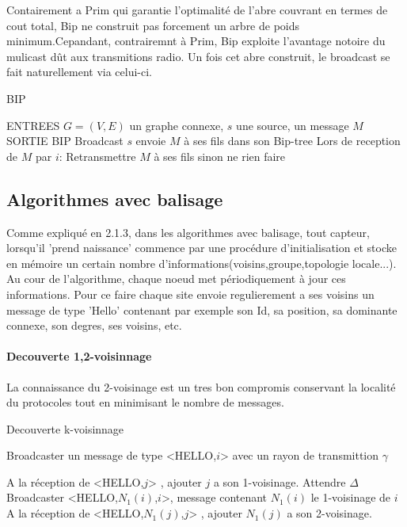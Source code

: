 Contairement a Prim qui garantie l'optimalité de l'abre couvrant en termes de cout total,
Bip ne construit pas forcement un arbre de poids minimum.Cepandant, contrairemnt à Prim, Bip exploite l'avantage notoire du mulicast dût aux transmitions radio. Un fois cet abre construit, le broadcast se fait naturellement via celui-ci.

\begin{algorithm}[h]
\caption{BIP}
\label{algo_BIP}
\begin{algorithmic}
\STATE ENTREES  $G=(V,E)$ un graphe connexe, $s$ une source, un message $M$
\STATE SORTIE  BIP Broadcast
\STATE $s$ envoie $M$ à ses fils dans son Bip-tree
\STATE Lors de reception de $M$ par $i$:
    \STATE Retransmettre $M$ à ses fils sinon ne rien faire
\ENDIF
\end{algorithmic}
\end{algorithm}


\subsection{Algorithmes avec balisage}
Comme expliqué en 2.1.3, dans les algorithmes avec balisage, tout capteur, lorsqu'il 'prend naissance' commence par une procédure d'initialisation et stocke en 
mémoire un certain nombre d'informations(voisins,groupe,topologie locale...). Au cour de l'algorithme, chaque noeud met périodiquement à jour ces informations. Pour ce faire chaque site envoie regulierement a ses voisins un message de type
'Hello' contenant par exemple son Id, sa position, sa dominante connexe, son degres, ses voisins, etc.\\
\paragraph{Decouverte 1,2-voisinnage}

La connaissance du 2-voisinage est un tres bon compromis conservant la localité du protocoles tout en minimisant le nombre de messages.


\begin{algorithm}[h]
\caption{Decouverte k-voisinnage}
\label{algo_k_voisinnage}
\begin{algorithmic}

	\STATE Broadcaster un message de type <HELLO,$i$> avec un rayon de transmittion $\gamma$
\ENDFOR

\STATE A la réception de <HELLO,$j$> , ajouter $j$ a son 1-voisinage.
\STATE Attendre $\Delta$
	\STATE Broadcaster <HELLO,$N_1(i)$,$i$>, message contenant $N_1(i)$ le 1-voisinage de $i$
	\STATE A la réception de <HELLO,$N_1(j)$,$j$> , ajouter $N_1(j)$ a son 2-voisinage.
	
\ENDFOR
\end{algorithmic}
\end{algorithm}

